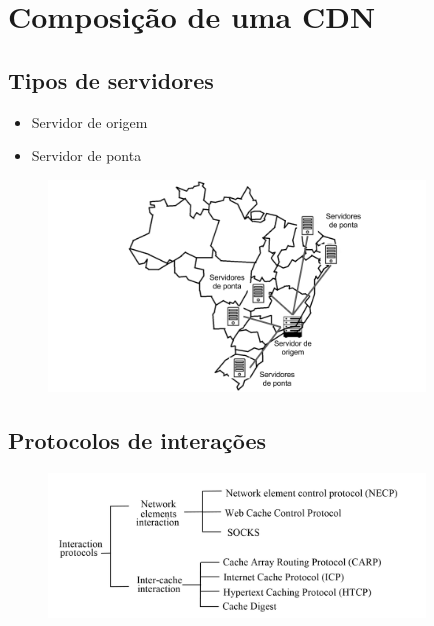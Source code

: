 \section{Composi\c{c}\~ao de uma CDN} \label{sec:composicao}
\subsection{Tipos de servidores}
\begin{itemize}
	\item Servidor de origem
	\item Servidor de ponta
\end{itemize}
\begin{figure}[h]
\includegraphics[width=10cm]{Figuras/tipos_servidores.png} 
\label{figura:tipos_servidores} 
\end{figure}

\subsection{Protocolos de intera\c{c}\~oes}

\begin{figure}[h]
\includegraphics[width=10cm]{Figuras/tipos_relacionamentos.png} 
\label{figura:tipos_relacionamentos}
\end{figure}



